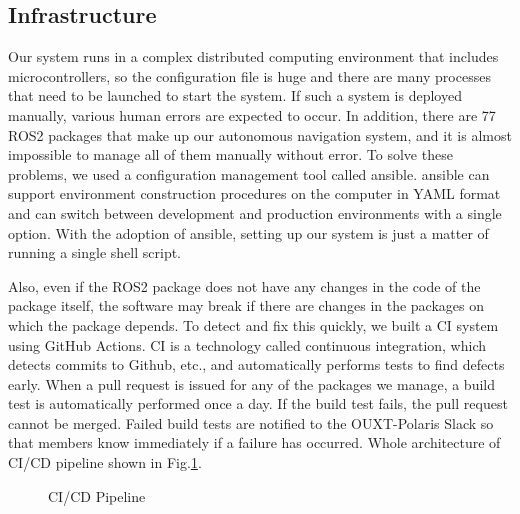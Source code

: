 \documentclass[lettersize,journal]{IEEEtran}
\begin{document}
\subsection{Infrastructure}
Our system runs in a complex distributed computing environment that includes microcontrollers,
so the configuration file is huge and there are many processes that need to be launched to start the system.
If such a system is deployed manually, various human errors are expected to occur.
In addition, there are 77 ROS2 packages that make up our autonomous navigation system,
and it is almost impossible to manage all of them manually without error.
To solve these problems, we used a configuration management tool called ansible.
ansible can support environment construction procedures on the computer in YAML format and
can switch between development and production environments with a single option.
With the adoption of ansible, setting up our system is just a matter of running a single shell script.

Also, even if the ROS2 package does not have any changes in the code of the package itself,
the software may break if there are changes in the packages on which the package depends.
To detect and fix this quickly, we built a CI system using GitHub Actions.
CI is a technology called continuous integration, which detects commits to Github, etc.,
and automatically performs tests to find defects early.
When a pull request is issued for any of the packages we manage, a build test is automatically performed once a day.
If the build test fails, the pull request cannot be merged.
Failed build tests are notified to the OUXT-Polaris Slack so that members know immediately if a failure has occurred.
Whole architecture of CI/CD pipeline shown in Fig.\ref{fig:ci_cd_pipeline}.

\begin{figure}[htbp]
    \begin{center}
  \end{center}
  \caption{CI/CD Pipeline}
  \label{fig:ci_cd_pipeline}
\end{figure}
\end{document}
